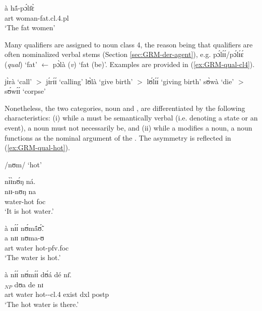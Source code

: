 \begin{exe}
\begin{exe}
\begin{exe}
\begin{exe}
\begin{exe}
\begin{exe}
\begin{exe}
\begin{exe}
\begin{exe}
  \ex\label{ex:GRM-qual-agree-pl}
\gll à hã́-pɔ́lɪ̄ɛ̀\\
{\sc art} woman-fat.{\sc cl.4.pl}\\
\glt `The fat women'
 
\z 
 \z
 
 Many qualifiers are assigned to noun class 4, the reason being that qualifiers are often nominalized verbal stems (Section \ref{sec:GRM-der-agent}), e.g. {\sls pɔ́lɪ́ɪ́/pɔ́lɪ́ɛ́} ({\it qual}) `fat' $\leftarrow$ {\sls pɔ̀là}  ({\it v})  `fat (be)'.  Examples are provided in  (\ref{ex:GRM-qual-cl4}).


\ea\label{ex:GRM-qual-cl4}
 
  \ea\label{ex:GRM-qual-cl4-call}
jɪ̀rà  {\rm `call'}  $>$ jɪ́rɪ́ɪ́ {\rm   `calling'}
\ex\label{ex:GRM-qual-cl4-give-birth}
lʊ̀là {\rm  `give birth'} $>$ lʊ́lɪ́ɪ́   {\rm `giving birth'}
\ex\label{ex:GRM-qual-cl4-die}
sʊ̀wà {\rm  `die'} $>$ sʊ́wɪ́ɪ́  {\rm  `corpse'}

  
\z 
 \z


Nonetheless, the two categories, noun and , are differentiated by the following characteristics: (i)  while a  must be semantically verbal (i.e. denoting a state or an event), a noun must not necessarily be, and (ii) while a  modifies a noun,  a  noun functions as  the nominal argument of the . The asymmetry is reflected in (\ref{ex:GRM-qual-hot}).

\ea\label{ex:GRM-qual-hot}{\rm  /nʊm/ `hot'}
 
  \ea\label{ex:GRM-qual-hot-cmp-stem}
  \glll nɪ̀ɪ̀nʊ́ŋ ná.\\
 nɪɪ-nʊŋ na\\
  water-hot {\sc foc}\\
  \glt `It is {\sc hot water}.'

 \ex\label{ex:GRM-qual-hot-head}
  \glll  à nɪ́ɪ́ nʊ́mã́ʊ̃́.\\
 a  nɪɪ nʊma-ʊ\\
   {\sc art} water hot-{\sc pfv.foc}\\
  \glt `The water is {\sc hot}.'

 \ex\label{ex:GRM-qual-hot-qual}
  \glll  à nɪ́ɪ́ nʊ́mɪ́ɪ́ dʊ́á dé nɪ̄.\\
 [a nɪɪ nʊm-ɪ-ɪ]$_{NP}$ dʊa de nɪ \\
  {\sc art} water hot-{\nmlz}-{\sc cl.4} exist {\sc dxl} {\sc postp}\\
  \glt `The hot water is there.'
  
\z 
 \z
 

\end{exe}
\end{exe}
\end{exe}
\end{exe}
\end{exe}
\end{exe}
\end{exe}
\end{exe}
\end{exe}
